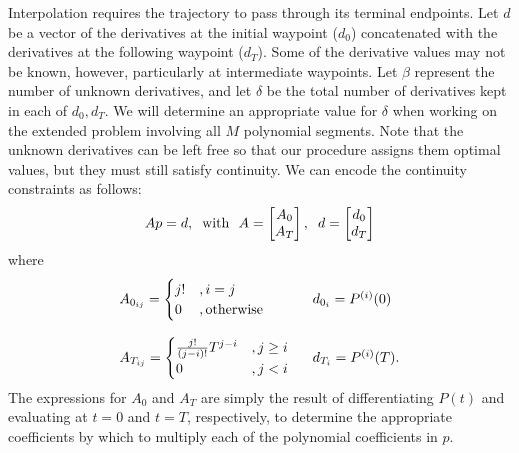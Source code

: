 Interpolation requires the trajectory to pass through its terminal endpoints. Let $d$ be a vector of the derivatives at the initial waypoint ($d_0$) concatenated with the derivatives at the following waypoint ($d_T$). Some of the derivative values may not be known, however, particularly at intermediate waypoints. Let $\beta$ represent the number of unknown derivatives, and let $\delta$ be the total number of derivatives kept in each of $d_0, d_T$. We will determine an appropriate value for $\delta$ when working on the extended problem involving all $M$ polynomial segments. Note that the unknown derivatives can be left free so that our procedure assigns them optimal values, but they must still satisfy continuity. We can encode the continuity constraints as follows:
\begin{equation}
      Ap = d, \hspace{2mm} \text{with \ }
      A = \begin{bmatrix}
            A_0 \\ A_T
          \end{bmatrix}, \hspace{2mm}
      d = \begin{bmatrix}
            d_0 \\ d_T
          \end{bmatrix}
\label{quad:eqn:constraint}    
\end{equation}  
where
\begin{equation}
    \begin{array}{l l}
        A_{0_{ij}} = \begin{cases}
                        j! & , i = j \\
                        0  & , \text{otherwise}
                     \end{cases}
        \ & \ 
        d_{0_i} = P^{(i)}(0)
        \\~\\
        A_{T_{ij}} = \begin{cases}
                        \frac{j!}{(j-i)!}T^{j-i} & , j \geq i \\
                        0  & , j < i
                     \end{cases}
        
        \ & \
        d_{T_i} = P^{(i)}(T).
        
    \end{array}
\end{equation}
The expressions for $A_0$ and $A_T$ are simply the result of differentiating $P(t)$ and evaluating at $t=0$ and $t=T$, respectively, to determine the appropriate coefficients by which to multiply each of the polynomial coefficients in $p$.

